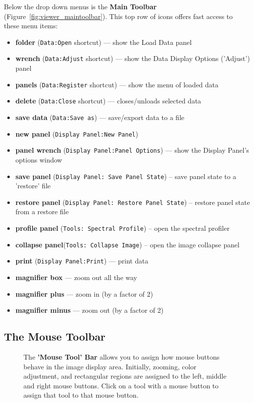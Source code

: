 Below the drop down menus is the {\bf Main Toolbar} (Figure~\ref{fig:viewer_maintoolbar}).
This top row of icons offers fast access to these menu items:
\begin{itemize}
   \item {\bf folder} ({\tt Data:Open} shortcut) --- show the Load Data panel
   \item {\bf wrench} ({\tt Data:Adjust} shortcut) --- show the Data Display
              Options ('Adjust') panel 
   \item {\bf panels} ({\tt Data:Register} shortcut) --- show the 
              menu of loaded data
   \item {\bf delete} ({\tt Data:Close} shortcut) --- closes/unloads 
              selected data
   \item {\bf save data} ({\tt Data:Save as}) --- save/export data to a file
   \item {\bf new panel} ({\tt Display Panel:New Panel})
   \item {\bf panel wrench} ({\tt Display Panel:Panel Options}) --- show
              the Display Panel's options window 
   
   \item  {\bf save panel} ({\tt Display Panel: Save Panel State}) -- save panel state to a 'restore' file
   \item  {\bf restore panel} ({\tt Display Panel: Restore Panel State}) -- restore panel state from a restore file
   \item  {\bf profile panel} ({\tt Tools: Spectral Profile}) -- open the spectral profiler
   \item  {\bf collapse panel}({\tt Tools: Collapse Image}) -- open the image collapse panel
   \item {\bf print} ({\tt Display Panel:Print}) --- print data
   \item {\bf magnifier box} --- zoom out all the way
   \item {\bf magnifier plus} --- zoom in (by a factor of 2)
   \item {\bf magnifier minus} --- zoom out (by a factor of 2)
\end{itemize}

\subsection{The Mouse Toolbar}

\begin{figure}[h!]
\begin{center}
\caption{\label{fig:viewer_mousetoolbar} The 
{\bf 'Mouse Tool' Bar} allows you to assign how mouse buttons behave in 
the image display area.  Initially, zooming, color adjustment, and rectangular 
regions are assigned to the left, middle and right mouse buttons. Click on a tool
with a mouse button to assign that tool to that mouse button.}
\hrulefill
\end{center}
\end{figure}

